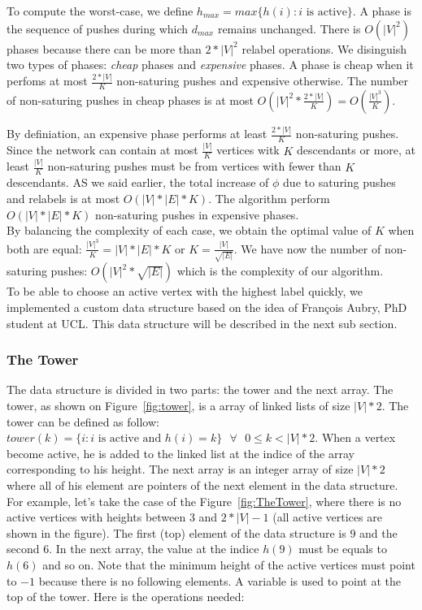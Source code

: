 To compute the worst-case, we define $h_{max} = max\{h(i) : i\text{ is active}\}$. A phase is the sequence of pushes during which $d_{max}$ remains unchanged. There is $O(|V|^2)$ phases because there can be more than $2*|V|^2$ relabel operations. We disinguish two types of phases: \textit{cheap} phases and \textit{expensive} phases. A phase is cheap when it perfoms at most $\frac{2*|V|}{K}$ non-saturing pushes and expensive otherwise. The number of non-saturing pushes in cheap phases is at most $O(|V|^2 * \frac{2*|V|}{K}) = O(\frac{|V|^3}{K})$.

By definiation, an expensive phase performs at least $\frac{2*|V|}{K}$ non-saturing pushes. Since the network can contain at most $\frac{|V|}{K}$ vertices witk $K$ descendants or more, at least $\frac{|V|}{K}$ non-saturing pushes must be from vertices with fewer than $K$ descendants. AS we said earlier, the total increase of $\phi$ due to saturing pushes and relabels is at most $O(|V|*|E|*K)$. The algorithm perform $O(|V|*|E|*K)$ non-saturing pushes in expensive phases.\\

By balancing the complexity of each case, we obtain the optimal value of $K$ when both are equal: $\frac{|V|^3}{K} = |V|*|E|*K$ or $K = \frac{|V|}{\sqrt{|E|}}$. We have now the number of non-saturing pushes: $O(|V|^2*\sqrt{|E|})$ which is the complexity of our algorithm.\\


To be able to choose an active vertex with the highest label quickly, we implemented a custom data structure based on the idea of Fran\c cois Aubry, PhD student at UCL. This data structure will be described in the next sub section.

\subsubsection{The Tower}

The data structure is divided in two parts: the tower and the next array. The tower, as shown on Figure~\ref{fig:tower}, is a array of linked lists of size $|V|*2$. The tower can be defined as follow: $tower(k) = \{i : i \text{ is active and } h(i) = k\} \text{ } \forall \text{ } 0 \le k < |V|*2$. When a vertex become active, he is added to the linked list at the indice of the array corresponding to his height. The next array is an integer array of size $|V|*2$ where all of his element are pointers of the next element in the data structure. For example, let's take the case of the Figure~\ref{fig:TheTower}, where there is no active vertices with heights between 3 and $2*|V|-1$ (all active vertices are shown in the figure). The first (top) element of the data structure is 9 and the second 6. In the next array, the value at the indice $h(9)$ must be equals to $h(6)$ and so on. Note that the minimum height of the active vertices must point to $-1$ because there is no following elements. A variable is used to point at the top of the tower. Here is the operations needed:

